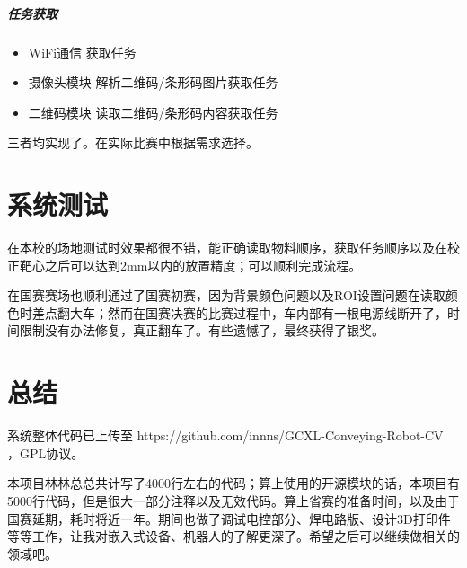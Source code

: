 \documentclass[a4paper,11pt,UTF8]{ctexart}
\begin{document}
\newpage

\subparagraph{任务获取}
\begin{itemize}
  \item WiFi通信 获取任务
  \item 摄像头模块 解析二维码/条形码图片获取任务
  \item 二维码模块 读取二维码/条形码内容获取任务
\end{itemize}
三者均实现了。在实际比赛中根据需求选择。




\section{系统测试}
在本校的场地测试时效果都很不错，能正确读取物料顺序，获取任务顺序以及在校正靶心之后可以达到2mm以内的放置精度；可以顺利完成流程。

在国赛赛场也顺利通过了国赛初赛，因为背景颜色问题以及ROI设置问题在读取颜色时差点翻大车；然而在国赛决赛的比赛过程中，车内部有一根电源线断开了，时间限制没有办法修复，真正翻车了。有些遗憾了，最终获得了银奖。

\section{总结}
系统整体代码已上传至 https://github.com/innns/GCXL-Conveying-Robot-CV ，GPL协议。

本项目林林总总共计写了4000行左右的代码；算上使用的开源模块的话，本项目有5000行代码，但是很大一部分注释以及无效代码。算上省赛的准备时间，以及由于国赛延期，耗时将近一年。期间也做了调试电控部分、焊电路版、设计3D打印件等等工作，让我对嵌入式设备、机器人的了解更深了。希望之后可以继续做相关的领域吧。


\end{document}

